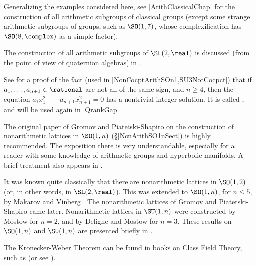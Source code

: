 \begin{notes}

Generalizing the examples considered here, see \cref{ArithClassicalChap} for the construction of all arithmetic subgroups of classical groups (except some strange arithmetic subgroups of groups, such as $\SO(1,7)$, whose complexification has $\SO(8,\complex)$ as a simple factor).

The construction of all arithmetic subgroups of
$\SL(2,\real)$ is discussed (from the point of view of
quaternion algebras) in \cite[Chap.~5]{SKatok-Fuchsian}.

See 
\cite[Cor.~2 of \S4.3.2, p.~43]{Serre-CourseArith} for a proof of the fact (used in \cref{NonCocptArithSOn1,SU3NotCocpct}) that if $a_1,\ldots,a_{n+1} \in \rational$ are not all of the same sign, and $n \ge 4$, then the equation $a_1 x_1^2 + \cdots a_{n+1} x_{n+1}^2 = 0$ has a nontrivial integer solution. It is called , and will be used again in \cref{QrankGap}.

The original paper of Gromov and Piatetski-Shapiro
\cite{GromovPS} on the construction of nonarithmetic
lattices in $\SO(1,n)$ (\S\ref{NonArithSO1nSect}) is highly
recommended. The exposition there is very understandable,
especially for a reader with some knowledge of arithmetic
groups and hyperbolic manifolds. A brief treatment also
appears in \cite[App.~C.2, pp.~362--364]{MargulisBook}.

It was known quite classically that there are nonarithmetic
lattices in $\SO(1,2)$ (or, in other words, in
$\SL(2,\real)$). This was extended to $\SO(1,n)$, for $n \le
5$, by Makarov \cite{Makarov-nonarith} and Vinberg
\cite{Vinberg-nonarith}. The nonarithmetic
lattices of Gromov and Piatetski-Shapiro
\cite{GromovPS} came later.
Nonarithmetic lattices in $\SU(1,n)$ were constructed by
Mostow \cite{Mostow-nonarith} for $n = 2$, and by Deligne and
Mostow \cite{DeligneMostow-nonarith} for $n = 3$. These
results on $\SO(1,n)$ and $\SU(1,n)$ are presented briefly
in \cite[App.~C, pp.~353--368]{MargulisBook}.

The Kronecker-Weber Theorem can be found in books on Class Field Theory, such as \cite[Thm.~5.1.10, p.~324]{Neukirch-AlgNumThy} (or see \cite{Greenberg-ElemPfKroneckerWeber}). 


\end{notes}
